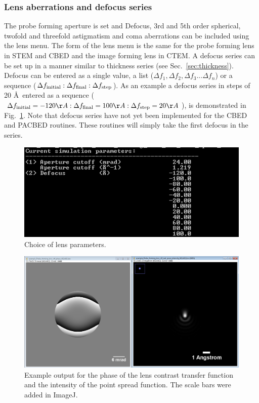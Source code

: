 \documentclass[12pt,a4paper]{article}
\begin{document}
\subsubsection{Lens aberrations and defocus series}
%
The probe forming aperture is set and Defocus, 3rd and 5th order spherical, twofold and threefold astigmatism and coma aberrations can be included using the lens menu. The form of the lens menu is the same for the probe forming lens in STEM and CBED and the image forming lens in CTEM. A defocus series can be set up in a manner similar to thickness series (see Sec.~\ref{sec:thickness}). Defocus can be entered as a single value, a list
($ \Delta f_1,\Delta f_2,\Delta f_3...\Delta f_n $)
or a sequence
($ \Delta f_{\rm initial}:\Delta f_{\rm final}:\Delta f_{\rm step}  $).
As an example a defocus series in steps of 20 \AA\, entered as a sequence ($ \Delta f_{\rm initial}=-120\AA:\Delta f_{\rm final}=100\AA:\Delta f_{\rm step}=20\AA  $), is demonstrated in Fig.~\ref{fig:lens_parameters}. Note that defocus series have not yet been implemented for the CBED and PACBED routines. These routines will simply take the first defocus in the series.
%
\begin{figure}[!h]
	\begin{center}
		\includegraphics[scale=1.0]{figures/lens_parameters.png}
		\caption{Choice of lens parameters.}
		\label{fig:lens_parameters}
	\end{center}
\end{figure}
%
\begin{figure}[!h]
	\begin{center}
		\includegraphics[width=\textwidth]{figures/aberrations.png}
		\caption{Example output for the phase of the lens contrast transfer function and the intensity of the point spread function. The scale bars were added in ImageJ.}
		\label{fig:aberrations}
	\end{center}
\end{figure}
\end{document}

